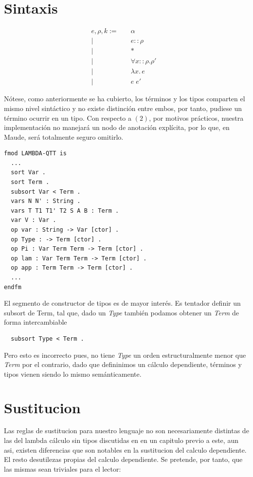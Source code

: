 \documentclass[a4paper,12pt]{report}
\theoremstyle{definition}
\theoremstyle{plain}
\theoremstyle{remark}
\begin{document}
    \section{Sintaxis}
\begin{align}
e, \rho, k := \quad & \alpha & \tag{1}\\
  \mid \quad & e :: \rho & \tag{2}\\
  \mid \quad & * \tag{3}\\
  \mid \quad & \forall x::\rho.\rho' \tag{4}\\
  \mid \quad & \lambda x.\, e & \tag{5}\\
  \mid \quad & e \; e' \tag{6}&
\end{align}

Nótese, como anteriormente se ha cubierto, los términos y los tipos comparten el mismo nivel sintáctico y no existe distinción entre embos, por tanto, pudiese un término ocurrir en un tipo. Con respecto a $(2)$, por motivos prácticos, nuestra implementación no manejará un nodo de anotación explícita, por lo que, en Maude, será totalmente seguro omitirlo. 
\newpage
\begin{lstlisting}
fmod LAMBDA-QTT is
  ...
  sort Var .
  sort Term .
  subsort Var < Term .
  vars N N' : String .
  vars T T1 T1' T2 S A B : Term .
  var V : Var .
  op var : String -> Var [ctor] .
  op Type : -> Term [ctor] .
  op Pi : Var Term Term -> Term [ctor] .
  op lam : Var Term Term -> Term [ctor] .
  op app : Term Term -> Term [ctor] .
  ...
endfm
\end{lstlisting}
El segmento de constructor de tipos es de mayor interés. Es tentador definir un subsort de Term, tal que, dado un \textit{Type} también podamos obtener un \textit{Term} de forma intercambiable
\begin{lstlisting}
  subsort Type < Term .
\end{lstlisting}
Pero esto es incorrecto pues, no tiene \textit{Type} un orden estructuralmente menor que \textit{Term} por el contrario, dado que defininimos un cálculo dependiente, términos y tipos vienen siendo lo mismo semánticamente.

\section{Sustitucion}
Las reglas de sustitucion para nuestro lenguaje no son necesariamente distintas de las del lambda cálculo sin tipos discutidas en en un capitulo previo a este, aun asi, existen diferencias que son notables en la sustitucion del calculo dependiente. El resto desutilezas propias del calculo dependiente. Se pretende, por tanto, que las mismas sean triviales para el lector:
\end{document}
